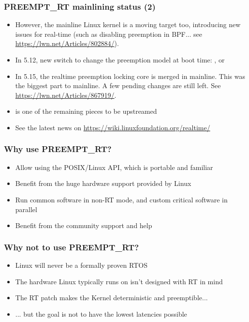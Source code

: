 \begin{frame}
  \frametitle{PREEMPT\_RT mainlining status (2)}
  \begin{itemize}
  \item However, the mainline Linux kernel is a moving target too,
        introducing new issues for real-time (such as disabling preemption in
        BPF... see \url{https://lwn.net/Articles/802884/}).
  \item In 5.12, new  switch to change the preemption
        model at boot time: ,  or
  \item In 5.15, the realtime preemption locking core is merged in mainline.
	This was the biggest part to mainline. A few pending changes are
	still left. See \url{https://lwn.net/Articles/867919/}.
  \item {} is one of the remaining pieces to be upstreamed
  \item See the latest news on \url{https://wiki.linuxfoundation.org/realtime/}
  \end{itemize}
\end{frame}

\begin{frame}
	\frametitle{Why use PREEMPT\_RT?}
	\begin{itemize}
		\item Allow using the POSIX/Linux API, which is portable and familiar
		\item Benefit from the huge hardware support provided by Linux
		\item Run common software in non-RT mode, and custom critical software in parallel
		\item Benefit from the community support and help
	\end{itemize}
\end{frame}

\begin{frame}
	\frametitle{Why not to use PREEMPT\_RT?}
	\begin{itemize}
		\item Linux will never be a formally proven RTOS
		\item The hardware Linux typically runs on isn't designed with RT in mind
		\item The RT patch makes the Kernel deterministic and preemptible...
		\item ... but the goal is not to have the lowest latencies possible
	\end{itemize}
\end{frame}

